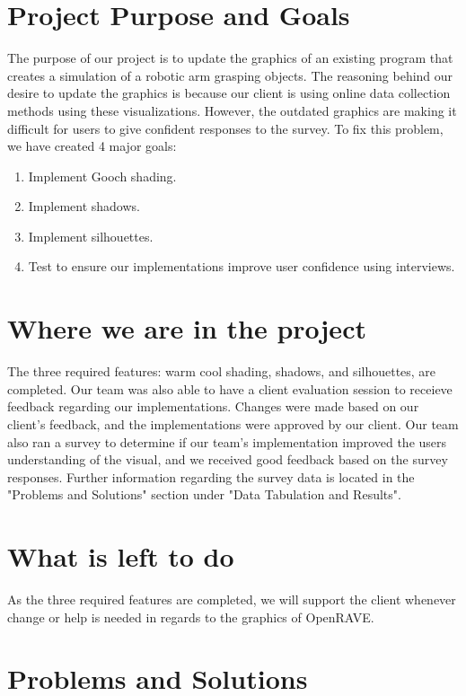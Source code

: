 \documentclass[10pt,journal,compsoc,draftclsnofoot]{IEEEtran}
\begin{document}
\begin{flushleft}

\section{Project Purpose and Goals}
The purpose of our project is to update the graphics of an existing program that creates a simulation of a robotic arm grasping objects.
The reasoning behind our desire to update the graphics is because our client is using online data collection methods using these visualizations.
However, the outdated graphics are making it difficult for users to give confident responses to the survey.
To fix this problem, we have created 4 major goals:
\begin{enumerate}
\item Implement Gooch shading.
\item Implement shadows.
\item Implement silhouettes.
\item Test to ensure our implementations improve user confidence using interviews.
\end{enumerate}

\section{Where we are in the project}
The three required features: warm cool shading, shadows, and silhouettes, are completed.
Our team was also able to have a client evaluation session to receieve feedback regarding our implementations.
Changes were made based on our client's feedback, and the implementations were approved by our client.
Our team also ran a survey to determine if our team's implementation improved the users understanding of the visual, and we received good feedback based on the survey responses.
Further information regarding the survey data is located in the "Problems and Solutions" section under "Data Tabulation and Results".

\section{What is left to do}
As the three required features are completed, we will support the client whenever change or help is needed in regards to the graphics of OpenRAVE.

\newpage

\section{Problems and Solutions}

\end{flushleft}
\end{document}
